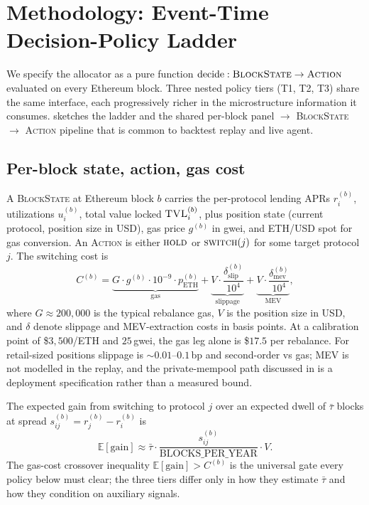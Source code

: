 \section{Methodology: Event-Time Decision-Policy Ladder}
\label{sec:methodology}

We specify the allocator as a pure function
$\textrm{decide}: \textsc{BlockState} \to \textsc{Action}$ evaluated
on every Ethereum block.  Three nested policy tiers (T1, T2, T3)
share the same interface, each progressively richer in the
microstructure information it consumes.  
sketches the ladder and the shared per-block panel
$\to$ \textsc{BlockState} $\to$ \textsc{Action} pipeline that is
common to backtest replay and live agent.



\subsection{Per-block state, action, gas cost}
\label{sec:methodology-state}

A \textsc{BlockState} at Ethereum block $b$ carries the per-protocol
lending APRs $r_i^{(b)}$, utilizations $u_i^{(b)}$, total value
locked $\textsc{TVL}_i^{(b)}$, plus position state (current
protocol, position size in USD), gas price $g^{(b)}$ in gwei, and
ETH/USD spot for gas conversion.  An \textsc{Action} is either
$\textsc{hold}$ or $\textsc{switch}(j)$ for some target protocol
$j$.  The switching cost is
\begin{equation}
\label{eq:cost}
C^{(b)} = \underbrace{G \cdot g^{(b)} \cdot 10^{-9} \cdot
            p_{\text{ETH}}^{(b)}}_{\text{gas}}
        + \underbrace{V \cdot \frac{\delta^{(b)}_{\text{slip}}}{10^{4}}}_{\text{slippage}}
        + \underbrace{V \cdot \frac{\delta^{(b)}_{\text{mev}}}{10^{4}}}_{\text{MEV}},
\end{equation}
where $G \approx 200{,}000$ is the typical rebalance gas, $V$ is the
position size in USD, and $\delta$ denote slippage and MEV-extraction
costs in basis points.  At a calibration point of \$$3{,}500$/ETH and
$25$\,gwei, the gas leg alone is \$$17.5$ per rebalance.  For
retail-sized positions slippage is $\sim 0.01$--$0.1$\,bp and
second-order vs gas; MEV is not modelled in the replay, and the
private-mempool path discussed in  is a deployment
specification rather than a measured bound.

The expected gain from switching to protocol $j$ over an expected
dwell of $\bar\tau$ blocks at spread $s_{ij}^{(b)} = r_j^{(b)} -
r_i^{(b)}$ is
\begin{equation}
\label{eq:gain}
\mathbb{E}[\text{gain}] \approx
  \bar\tau \cdot \frac{s_{ij}^{(b)}}{\text{BLOCKS\_PER\_YEAR}}
  \cdot V .
\end{equation}
The gas-cost crossover inequality $\mathbb{E}[\text{gain}] > C^{(b)}$
is the universal gate every policy below must clear; the three
tiers differ only in how they estimate $\bar\tau$ and how they
condition on auxiliary signals.

